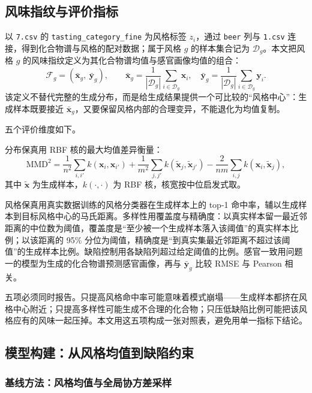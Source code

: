 ﻿\documentclass[UTF8,a4paper,zihao=-4]{ctexart}
\numberwithin{figure}{section}
\numberwithin{table}{section}
\numberwithin{equation}{section}
\newcommand{\file}[1]{\texttt{#1}}
\begin{document}
\subsection{风味指纹与评价指标}

以 \file{7.csv} 的 \file{tasting\_category\_fine} 为风格标签 $z_i$，通过 \file{beer} 列与 \file{1.csv} 连接，得到化合物谱与风格的配对数据；属于风格 $g$ 的样本集合记为 $\mathcal{D}_g$。本文把风格 $g$ 的风味指纹定义为其化合物谱均值与感官画像均值的组合：
\begin{equation}
\mathcal{F}_g=\left(\bar{\bm{x}}_g,\ \bar{\bm{y}}_g\right),\qquad
\bar{\bm{x}}_g=\frac{1}{|\mathcal{D}_g|}\sum_{i\in\mathcal{D}_g}\bm{x}_i,\quad
\bar{\bm{y}}_g=\frac{1}{|\mathcal{D}_g|}\sum_{i\in\mathcal{D}_g}\bm{y}_i .
\label{eq:fingerprint}
\end{equation}
该定义不替代完整的生成分布，而是给生成结果提供一个可比较的“风格中心”：生成样本既要接近 $\bar{\bm{x}}_g$，又要保留风格内部的合理变异，不能退化为均值复制。

五个评价维度如下。

分布保真用 RBF 核的最大均值差异衡量：
\begin{equation}
\mathrm{MMD}^2=\frac{1}{n^2}\sum_{i,i'}k(\bm{x}_i,\bm{x}_{i'})
+\frac{1}{m^2}\sum_{j,j'}k(\tilde{\bm{x}}_j,\tilde{\bm{x}}_{j'})
-\frac{2}{nm}\sum_{i,j}k(\bm{x}_i,\tilde{\bm{x}}_j),
\label{eq:mmd}
\end{equation}
其中 $\tilde{\bm{x}}$ 为生成样本，$k(\cdot,\cdot)$ 为 RBF 核，核宽按中位启发式取。

风格保真用真实数据训练的风格分类器在生成样本上的 top-1 命中率，辅以生成样本到目标风格中心的马氏距离。多样性用覆盖度与精确度：以真实样本留一最近邻距离的中位数为阈值，覆盖度是“至少被一个生成样本落入该阈值”的真实样本比例；以该距离的 95\% 分位为阈值，精确度是“到真实集最近邻距离不超过该阈值”的生成样本比例。缺陷控制用各缺陷列超过给定阈值的比例。感官一致用问题一的模型为生成的化合物谱预测感官画像，再与 $\bar{\bm{y}}_g$ 比较 RMSE 与 Pearson 相关。

五项必须同时报告。只提高风格命中率可能意味着模式崩塌——生成样本都挤在风格中心附近；只提高多样性可能生成不合理的化合物；只压低缺陷比例可能把该风格应有的风味一起压掉。本文用这五项构成一张对照表，避免用单一指标下结论。

\subsection{模型构建：从风格均值到缺陷约束}

\subsubsection{基线方法：风格均值与全局协方差采样}
\end{document}
